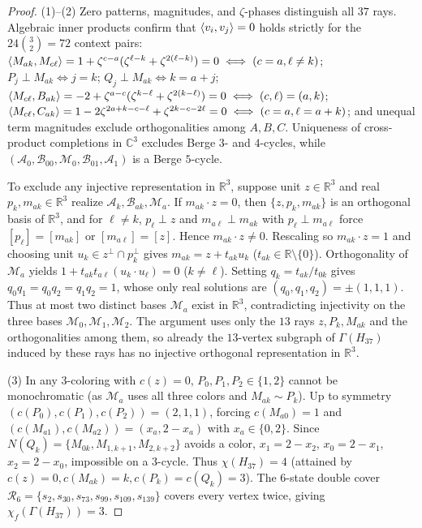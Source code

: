 \documentclass[aps,pra,reprint,superscriptaddress,longbibliography,nofootinbib,floatfix,10pt]{revtex4-2}
\theoremstyle{definition}\newtheorem{definition}[theorem]{Definition}
\theoremstyle{remark}\newtheorem{remark}[theorem]{Remark}
\newcommand{\C}{\mathbb C}\newcommand{\R}{\mathbb R}\newcommand{\Q}{\mathbb Q}
\begin{document}
\begin{proof}
(1)--(2) Zero patterns, magnitudes, and $\zeta$-phases distinguish all $37$ rays. Algebraic inner products confirm that $\langle v_i,v_j\rangle=0$ holds strictly for the $24\binom{3}{2}=72$ context pairs: $\langle M_{ak},M_{c\ell}\rangle=1+\zeta^{c-a}(\zeta^{\ell-k}+\zeta^{2(\ell-k)})=0\iff(c=a,\ell\ne k)$; $P_j\perp M_{ak}\iff j=k$; $Q_j\perp M_{ak}\iff k=a+j$; $\langle M_{c\ell},B_{ak}\rangle=-2+\zeta^{a-c}(\zeta^{k-\ell}+\zeta^{2(k-\ell)})=0\iff(c,\ell)=(a,k)$; $\langle M_{c\ell},C_{ak}\rangle=1-2\zeta^{2a+k-c-\ell}+\zeta^{2k-c-2\ell}=0\iff(c=a,\ell=a+k)$; and unequal term magnitudes exclude orthogonalities among $A,B,C$. Uniqueness of cross-product completions in $\C^3$ excludes Berge $3$- and $4$-cycles, while $(\mathcal A_0,\mathcal B_{00},\mathcal M_0,\mathcal B_{01},\mathcal A_1)$ is a Berge $5$-cycle.

\label{h:sec:no-real-for}
To exclude any injective representation in $\R^3$, suppose unit $z\in\R^3$ and real $p_k,m_{ak}\in\R^3$ realize $\mathcal A_k,\mathcal B_{ak},\mathcal M_a$. If $m_{ak}\cdot z=0$, then $\{z,p_k,m_{ak}\}$ is an orthogonal basis of $\R^3$, and for $\ell\ne k$, $p_\ell\perp z$ and $m_{a\ell}\perp m_{ak}$ with $p_\ell\perp m_{a\ell}$ force $[p_\ell]=[m_{ak}]$ or $[m_{a\ell}]=[z]$. Hence $m_{ak}\cdot z\ne 0$. Rescaling so $m_{ak}\cdot z=1$ and choosing unit $u_k\in z^\perp\cap p_k^\perp$ gives $m_{ak}=z+t_{ak}u_k$ ($t_{ak}\in\R\setminus\{0\}$). Orthogonality of $\mathcal M_a$ yields $1+t_{ak}t_{a\ell}(u_k\cdot u_\ell)=0$ ($k\ne\ell$). Setting $q_k=t_{ak}/t_{0k}$ gives $q_0q_1=q_0q_2=q_1q_2=1$, whose only real solutions are $(q_0,q_1,q_2)=\pm(1,1,1)$. Thus at most two distinct bases $\mathcal M_a$ exist in $\R^3$, contradicting injectivity on the three bases $\mathcal M_0,\mathcal M_1,\mathcal M_2$. The argument uses only the $13$ rays $z,P_k,M_{ak}$ and the orthogonalities among them, so already the $13$-vertex subgraph of $\Gamma(H_{37})$ induced by these rays has no injective orthogonal representation in $\R^3$.

(3) In any $3$-coloring with $c(z)=0$, $P_0,P_1,P_2\in\{1,2\}$ cannot be monochromatic (as $\mathcal M_a$ uses all three colors and $M_{ak}\sim P_k$). Up to symmetry $(c(P_0),c(P_1),c(P_2))=(2,1,1)$, forcing $c(M_{a0})=1$ and $(c(M_{a1}),c(M_{a2}))=(x_a,2-x_a)$ with $x_a\in\{0,2\}$. Since $N(Q_k)=\{M_{0k},M_{1,k+1},M_{2,k+2}\}$ avoids a color, $x_1=2-x_2$, $x_0=2-x_1$, $x_2=2-x_0$, impossible on a $3$-cycle. Thus $\chi(H_{37})=4$ (attained by $c(z)=0,c(M_{ak})=k,c(P_k)=c(Q_k)=3$). The $6$-state double cover $\mathcal R_6=\{s_2,s_{30},s_{73},s_{99},s_{109},s_{139}\}$ covers every vertex twice, giving $\chi_f(\Gamma(H_{37}))=3$.


\end{proof}
\end{document}
